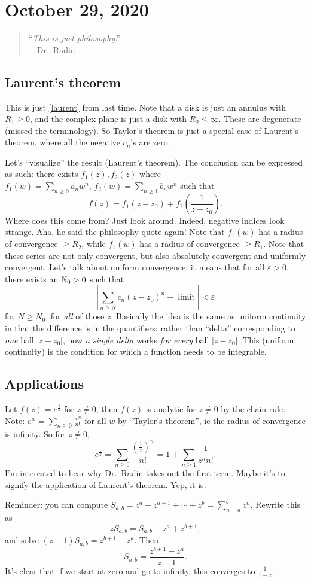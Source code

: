 \section{October 29, 2020}
\begin{quote}
    ``\textit{This is just philosophy}.''\\
—Dr.\ Radin
\end{quote}

\subsection{Laurent's theorem}
This is just \cref{laurent} from last time. Note that a disk is just an annulus with $R_1\geq 0$, and the complex plane is just a disk with $R_2\leq\infty$. These are degenerate (missed the terminology). So Taylor's theorem is just a special case of Laurent's theorem, where all the negative $c_n $'s are zero.

Let's ``visualize'' the result (Laurent's theorem). The conclusion can be expressed as such: there exists $f_1(z),f_2(z)$ where $f_1(w)=\sum_{n\geq 0}^{} a_n w^n , \, f_2(w)=\sum_{n\geq 1}^{} b_n w^n $ such that \[
    f(z)=f_1(z-z_0)+f_2\left( \frac{1}{z-z_0} \right) .
\] Where does this come from? Just look around. Indeed, negative indices look strange. Aha, he said the philosophy quote again! Note that $f_1(w)$ has a radius of convergence $\geq R_2$, while $f_1(w)$ has a radius of convergence $\geq R_1$. Note that these series are not only convergent, but also absolutely convergent and uniformly convergent. Let's talk about uniform convergence: it means that for all $\varepsilon >0$, there exists an $\mathbb{N}_0>0$ such that\[
\left| \sum_{n\geq N}^{} c_n (z-z_0)^n - \operatorname{limit} \right| <\varepsilon 
\] for $N\geq N_0$, for \emph{all} of those $z$. Basically the idea is the same as uniform continuity in that the difference is in the quantifiers: rather than ``delta'' corresponding to \emph{one} ball $|z-z_0|$, now \emph{a single delta} works \emph{for every} ball $|z-z_0|$. This (uniform continuity) is the condition for which a function needs to be integrable.
\subsection{Applications}
\begin{example}
    Let $f(z)=e^{\frac{1}{z}}$ for $z\neq 0$, then $f(z)$ is analytic for $z\neq 0$ by the chain rule. Note: $
    e^{w}=\sum_{n\geq 0}^{} \frac{w^n}{n!} 
    $ for all $w$ by ``Taylor's theorem'', ie the radius of convergence is infinity. So for $z\neq 0$, \[
    e^{\frac{1}{z}}=\sum_{n\geq 0}^{} \frac{\left( \frac{1}{z} \right) ^n }{n!}=1+\sum_{n\geq 1}^{} \frac{1}{z^n  n!}.
\] I'm interested to hear why Dr.\ Radin takes out the first term. Maybe it's to signify the application of Laurent's theorem. Yep, it is.
\end{example}
Reminder: you can compute
$S_{a,b}=z^a+z^{a+1}+\cdots +z^b=\sum_{n=a}^{b} z^n $. Rewrite this as \[
zS_{a,b}=S_{a,b}-z^a+z^{b+1},
\] and solve $(z-1)S_{a,b}=z^{b+1}-z^a$. Then \[
S_{a,b}=\frac{z^{b+1}-z^a}{z-1}. \] It's clear that if we start at zero and go to infinity, this converges to $\frac{1}{1-z}$.

